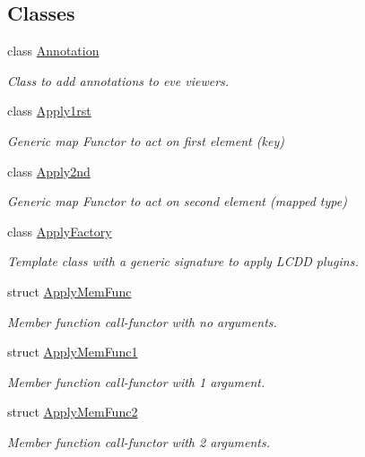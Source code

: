 \subsection*{Classes}
\begin{DoxyCompactItemize}
\item 
class \hyperlink{class_d_d4hep_1_1_annotation}{Annotation}
\begin{DoxyCompactList}\small\item\em Class to add annotations to eve viewers. \end{DoxyCompactList}\item 
class \hyperlink{class_d_d4hep_1_1_apply1rst}{Apply1rst}
\begin{DoxyCompactList}\small\item\em Generic map Functor to act on first element (key) \end{DoxyCompactList}\item 
class \hyperlink{class_d_d4hep_1_1_apply2nd}{Apply2nd}
\begin{DoxyCompactList}\small\item\em Generic map Functor to act on second element (mapped type) \end{DoxyCompactList}\item 
class \hyperlink{class_d_d4hep_1_1_apply_factory}{Apply\+Factory}
\begin{DoxyCompactList}\small\item\em Template class with a generic signature to apply L\+C\+DD plugins. \end{DoxyCompactList}\item 
struct \hyperlink{struct_d_d4hep_1_1_apply_mem_func}{Apply\+Mem\+Func}
\begin{DoxyCompactList}\small\item\em Member function call-\/functor with no arguments. \end{DoxyCompactList}\item 
struct \hyperlink{struct_d_d4hep_1_1_apply_mem_func1}{Apply\+Mem\+Func1}
\begin{DoxyCompactList}\small\item\em Member function call-\/functor with 1 argument. \end{DoxyCompactList}\item 
struct \hyperlink{struct_d_d4hep_1_1_apply_mem_func2}{Apply\+Mem\+Func2}
\begin{DoxyCompactList}\small\item\em Member function call-\/functor with 2 arguments. \end{DoxyCompactList}\item 

\end{DoxyCompactItemize}
